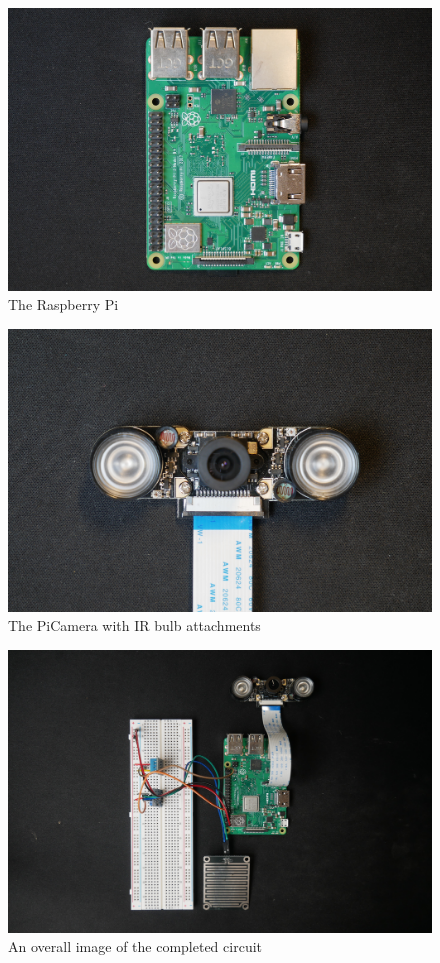 \documentclass[10pt,a4paper]{article}
\begin{document}
\begin{figure}[H]
  \centering
    \includegraphics[width=\linewidth]{images/RPi.jpg}
    \caption{The Raspberry Pi}
    \label{fig:Raspberry Pi}
\end{figure}

\begin{figure}[H]
  \centering
    \includegraphics[width=\linewidth]{images/piCam.jpg}
    \caption{The PiCamera with IR bulb attachments}
    \label{fig:piCam}
\end{figure}

\begin{figure}[H]
  \centering
    \includegraphics[width=\linewidth]{images/overView.jpg}
    \caption{An overall image of the completed circuit}
    \label{fig:overView}
\end{figure}
\end{document}
